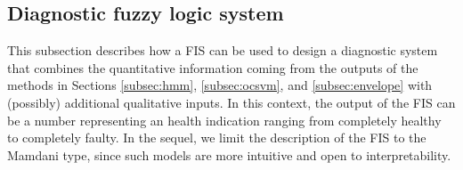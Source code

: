 \subsection{Diagnostic fuzzy logic system}\label{subsec:fuzzy}
This subsection describes how a FIS can be used to design a diagnostic system that combines the quantitative information coming from the outputs of the methods in Sections \ref{subsec:hmm}, \ref{subsec:ocsvm}, and \ref{subsec:envelope} with (possibly) additional qualitative inputs. In this context, the output of the FIS can be a number representing an health indication ranging from completely healthy to completely faulty. 
%
%
In the sequel, we limit the description of the FIS to the Mamdani type, {since such models are more intuitive and open to interpretability}.

